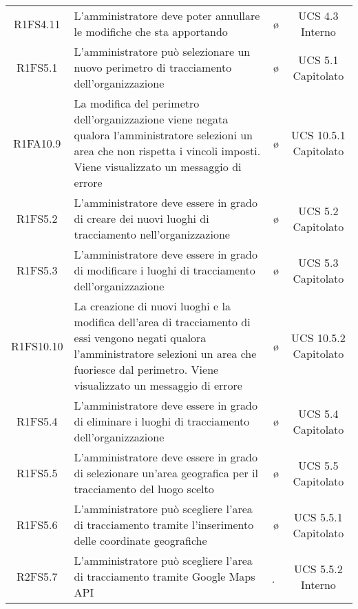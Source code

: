 {\begin{longtable}{ c C{8cm} c c}
R1FS4.11 & L'amministratore deve poter annullare le modifiche che sta apportando & \o & UCS 4.3 Interno\\




R1FS5.1 & L'amministratore può selezionare un nuovo perimetro di tracciamento dell'organizzazione & \o & UCS 5.1 Capitolato\\

R1FA10.9 & La modifica del perimetro dell'organizzazione viene negata qualora l'amministratore selezioni un area che non rispetta i vincoli imposti. Viene visualizzato un messaggio di errore & \o & UCS 10.5.1 Capitolato \\

R1FS5.2 & L'amministratore deve essere in grado di creare dei nuovi luoghi di tracciamento nell'organizzazione & \o & UCS 5.2 Capitolato\\

R1FS5.3 & L'amministratore deve essere in grado di modificare i luoghi di tracciamento dell'organizzazione  & \o & UCS 5.3 Capitolato\\

R1FS10.10 & La creazione di nuovi luoghi e la modifica dell'area di tracciamento di essi vengono negati qualora l'amministratore selezioni un area che fuoriesce dal perimetro. Viene visualizzato un messaggio di errore & \o & UCS 10.5.2 Capitolato \\

R1FS5.4 & L'amministratore deve essere in grado di eliminare i luoghi di tracciamento dell'organizzazione  & \o & UCS 5.4 Capitolato\\

R1FS5.5 & L'amministratore deve essere in grado di selezionare un'area geografica per il tracciamento del luogo scelto  & \o & UCS 5.5 Capitolato\\

R1FS5.6 &  L'amministratore può scegliere l'area di tracciamento tramite l'inserimento delle coordinate geografiche & \o & UCS 5.5.1 Capitolato\\

R2FS5.7 & L'amministratore può scegliere l'area di tracciamento tramite Google Maps API & \d & UCS 5.5.2 Interno\\


\end{longtable}}
